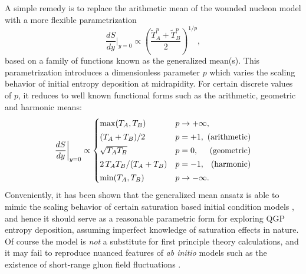 \documentclass[aps,prc,reprint,amsmath,nofootinbib]{revtex4-1}
\newcommand{\T}{\tilde{T}}
\begin{document}
A simple remedy is to replace the arithmetic mean of the wounded nucleon model with a more flexible parametrization
\begin{equation}
  \label{eq:gmean}
  \frac{dS}{dy}\bigg\vert_{y=0} \propto \left( \frac{\T_A^p + \T_B^p}{2} \right)^{1/p},
\end{equation}
based on a family of functions known as the generalized mean(s).
This parametrization introduces a dimensionless parameter $p$ which varies the scaling behavior of initial entropy deposition at midrapidity.
For certain discrete values of $p$, it reduces to well known functional forms such as the arithmetic, geometric and harmonic means:
\begin{equation}
  \newlength{\extraspace}
  \setlength{\extraspace}{0.5ex}
  \frac{dS}{dy}\bigg\vert_{y=0} \propto
  \begin{cases}
    \max(T_A, T_B) & p \rightarrow +\infty, \\[\extraspace]
    (T_A + T_B)/2 & p = +1, \hfill \text{ (arithmetic)} \\[\extraspace]
    \sqrt{T_A T_B} & p = 0, \hfill \text{ (geometric)} \\[\extraspace]
    2\, T_A T_B/(T_A + T_B) & p = -1, \hfill \text{ (harmonic)} \\[\extraspace]
    \min(T_A, T_B) & p \rightarrow -\infty.
  \end{cases}
  \label{eq:trento_p}
\end{equation}
Conveniently, it has been shown that the generalized mean ansatz is able to mimic the scaling behavior of certain saturation based initial condition models \cite{Bernhard:2016tnd}, and hence it should serve as a reasonable parametric form for exploring QGP entropy deposition, assuming imperfect knowledge of saturation effects in nature.
Of course the model is \emph{not} a substitute for first principle theory calculations, and it may fail to reproduce nuanced features of \emph{ab initio} models such as the existence of short-range gluon field fluctuations \cite{Schenke:2012wb}.
\end{document}
